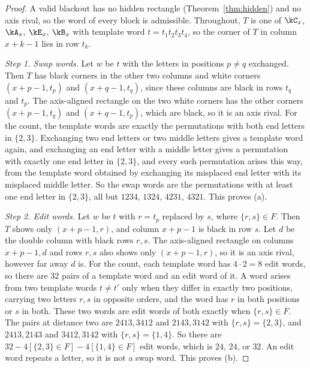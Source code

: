 \begin{proof}
A valid blackout has no hidden rectangle (Theorem~\ref{thm:hidden}) and no axis rival, so the word of every block is admissible. Throughout, $T$ is one of $\kC_x$, $\kA_x$, $\kE_x$, $\kB_x$ with template word $t=t_1t_2t_3t_4$, so the corner of $T$ in column $x+k-1$ lies in row $t_k$.

\emph{Step 1. Swap words.} Let $w$ be $t$ with the letters in positions $p\ne q$ exchanged. Then $T$ has black corners in the other two columns and white corners $(x+p-1,t_p)$ and $(x+q-1,t_q)$, since these columns are black in rows $t_q$ and $t_p$. The axis-aligned rectangle on the two white corners has the other corners $(x+p-1,t_q)$ and $(x+q-1,t_p)$, which are black, so it is an axis rival. For the count, the template words are exactly the permutations with both end letters in $\{2,3\}$. Exchanging two end letters or two middle letters gives a template word again, and exchanging an end letter with a middle letter gives a permutation with exactly one end letter in $\{2,3\}$, and every such permutation arises this way, from the template word obtained by exchanging its misplaced end letter with its misplaced middle letter. So the swap words are the permutations with at least one end letter in $\{2,3\}$, all but $1234$, $1324$, $4231$, $4321$. This proves (a).

\emph{Step 2. Edit words.} Let $w$ be $t$ with $r=t_p$ replaced by $s$, where $\{r,s\}\in F$. Then $T$ shows only $(x+p-1,r)$, and column $x+p-1$ is black in row $s$. Let $d$ be the double column with black rows $r,s$. The axis-aligned rectangle on columns $x+p-1,d$ and rows $r,s$ also shows only $(x+p-1,r)$, so it is an axis rival, however far away $d$ is. For the count, each template word has $4\cdot2=8$ edit words, so there are $32$ pairs of a template word and an edit word of it. A word arises from two template words $t\ne t'$ only when they differ in exactly two positions, carrying two letters $r,s$ in opposite orders, and the word has $r$ in both positions or $s$ in both. These two words are edit words of both exactly when $\{r,s\}\in F$. The pairs at distance two are $2413,3412$ and $2143,3142$ with $\{r,s\}=\{2,3\}$, and $2413,2143$ and $3412,3142$ with $\{r,s\}=\{1,4\}$. So there are $32-4[\{2,3\}\in F]-4[\{1,4\}\in F]$ edit words, which is $24$, $24$, or $32$. An edit word repeats a letter, so it is not a swap word. This proves (b).


\end{proof}
